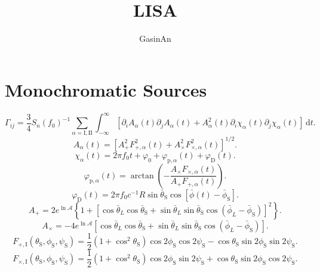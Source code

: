 \documentclass[a3paper]{ctexart}
\title{LISA}
\author{GasinAn}
\def\d{\mathrm{d}}
\begin{document}
    \maketitle
    \section{Monochromatic Sources}
    \begin{equation*}
        \Gamma_{ij}=\frac{3}{4}S_n(f_0)^{-1}\sum_{\alpha=\text{I},\text{II}}\int_{-\infty}^{\infty}\left[\partial_i A_\alpha(t)\partial_j A_\alpha(t)+A^2_\alpha(t)\partial_i \chi_\alpha(t)\partial_j \chi_\alpha(t)\right]\,\d t.
    \end{equation*}
    \begin{equation*}
        A_\alpha(t)=\left[A_+^2F_{+,\alpha}^2(t)+A_\times^2F_{\times,\alpha}^2(t)\right]^{1/2}.
    \end{equation*}
    \begin{equation*}
        \chi_\alpha(t)=2\pi f_0t+\varphi_0+\varphi_{\text{p},\alpha}(t)+\varphi_\text{D}(t).
    \end{equation*}
    \begin{equation*}
        \varphi_{\text{p},\alpha}(t)=\arctan\left(-\frac{A_\times F_{\times,\alpha}(t)}{A_+F_{+,\alpha}(t)}\right).
    \end{equation*}
    \begin{equation*}
        \varphi_\text{D}(t)=2\pi f_0c^{-1}R\sin\bar{\theta}_\text{S}\cos\left[\bar{\phi}(t)-\bar{\phi}_\text{S}\right].
    \end{equation*}
    \begin{equation*}
        A_+=2e^{\ln\mathcal{A}}\left\{1+\left[\cos\bar{\theta}_L\cos\bar{\theta}_\text{S}+\sin\bar{\theta}_L\sin\bar{\theta}_\text{S}\cos(\bar{\phi}_L-\bar{\phi}_\text{S})\right]^2\right\}.
    \end{equation*}
    \begin{equation*}
        A_\times=-4e^{\ln\mathcal{A}}\left[\cos\bar{\theta}_L\cos\bar{\theta}_\text{S}+\sin\bar{\theta}_L\sin\bar{\theta}_\text{S}\cos(\bar{\phi}_L-\bar{\phi}_\text{S})\right].
    \end{equation*}
    \begin{equation*}
        F_{+,\text{I}}(\theta_\text{S},\phi_\text{S},\psi_\text{S})=\frac{1}{2}(1+\cos^2\theta_\text{S})\cos2\phi_\text{S}\cos2\psi_\text{S}-\cos\theta_\text{S}\sin2\phi_\text{S}\sin2\psi_\text{S}.
    \end{equation*}
    \begin{equation*}
        F_{\times,\text{I}}(\theta_\text{S},\phi_\text{S},\psi_\text{S})=\frac{1}{2}(1+\cos^2\theta_\text{S})\cos2\phi_\text{S}\sin2\psi_\text{S}+\cos\theta_\text{S}\sin2\phi_\text{S}\cos2\psi_\text{S}.
    \end{equation*}
\end{document}
